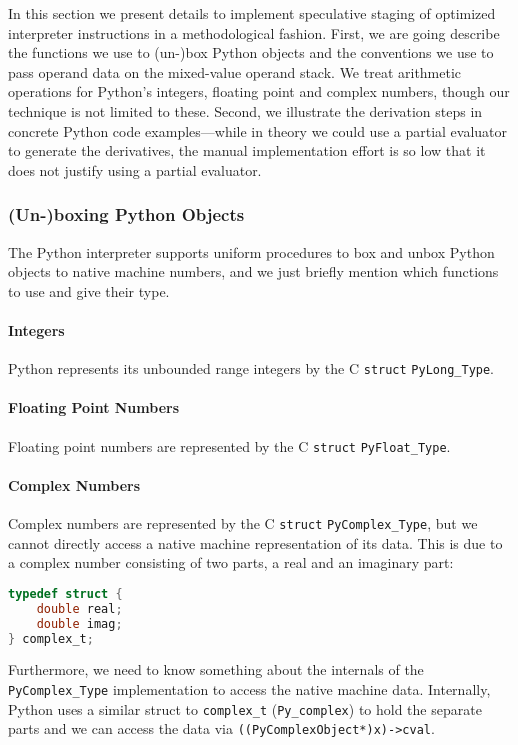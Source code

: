 \documentclass[preprint,10pt]{popl14conf}
\newcommand{\pyType}[1]{\texttt{Py#1\_Type}}
\begin{document}
In this section we present details to implement speculative staging of optimized interpreter
instructions in a methodological fashion.
First, we are going describe the functions we use to (un-)box Python objects and the conventions we
use to pass operand data on the mixed-value operand stack.
We treat arithmetic operations for Python's integers, floating point and complex numbers, though our
technique is not limited to these.
Second, we illustrate the derivation steps in concrete Python code examples---while in theory we
could use a partial evaluator to generate the derivatives, the manual implementation effort is so
low that it does not justify using a partial evaluator.


\subsubsection{(Un-)boxing Python Objects}

The Python interpreter supports uniform procedures to box and unbox Python objects to native machine
numbers, and we just briefly mention which functions to use and give their type.

\paragraph{Integers}
Python represents its unbounded range integers by the C \texttt{struct} \pyType{Long}.



\paragraph{Floating Point Numbers}
Floating point numbers are represented by the C \texttt{struct} \pyType{Float}.



\paragraph{Complex Numbers}
Complex numbers are represented by the C \texttt{struct} \pyType{Complex}, but we cannot directly
access a native machine representation of its data.
This is due to a complex number consisting of two parts, a real and an imaginary part:
\begin{lstlisting}[language=C,style=othercode]
typedef struct {
    double real;
    double imag;
} complex_t;
\end{lstlisting}
Furthermore, we need to know something about the internals of the \pyType{Complex} implementation to
access the native machine data.
Internally, Python uses a similar struct to \texttt{complex_t} (\texttt{Py_complex}) to hold the
separate parts and we can access the data via \texttt{((PyComplexObject*)x)->cval}.
\end{document}
